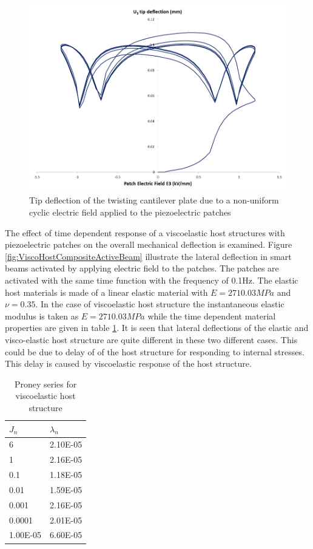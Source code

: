 \begin{figure} 
\centering
\includegraphics[width=6.0in]{./chap_2_pol_sw/figures/Fig14_tiptwistingcompositeactivebeam.png}
\caption{Tip deflection of the twisting cantilever plate due to a non-uniform cyclic electric field applied to the piezoelectric patches}
\label{fig:Fig14_tiptwistingcompositeactivebeam} 
\end{figure}

The effect of time dependent response of a viscoelastic host structures with piezoelectric patches on the overall mechanical deflection is examined. 
Figure \ref{fig:ViscoHostCompositeActiveBeam} illustrate the lateral deflection in smart beams activated by applying electric field to the patches. 
The patches are activated with the same time function with the frequency of 0.1Hz. 
The elastic host materials is made of a linear elastic material with $E=2710.03 MPa$ and $\nu = 0.35$. 
In the case of viscoelastic host structure the instantaneous elastic modulus is taken as $E=2710.03 MPa$ while the time dependent material properties are given in table \ref{table:Proney_Host}. 
It is seen that lateral deflections of the elastic and visco-elastic host structure are quite different in these two different cases. 
This could be due to delay of of the host structure for responding to internal stresses. 
This delay is caused by viscoelastic response of the host structure.

\begin{table}
\caption{Proney series for viscoelastic host structure}
\centering
\begin{tabular}{|l|l|}
\hline
$J_n$&$\lambda_n$\\ \hline
6&2.10E-05\\ \hline
1&2.16E-05\\ \hline
0.1&1.18E-05\\ \hline
0.01&1.59E-05\\ \hline
0.001&2.16E-05\\ \hline
0.0001&2.01E-05\\ \hline
1.00E-05&6.60E-05\\ \hline
\end{tabular}
\label{table:Proney_Host}
\end{table}

